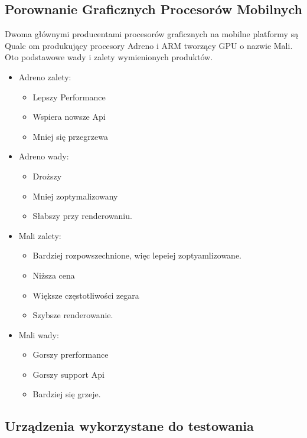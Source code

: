 \subsection[Porownanie Graficznych Procesorów Mobilnych]{Porownanie Graficznych Procesorów Mobilnych}
Dwoma głównymi producentami procesorów graficznych na mobilne platformy są Qualc om produkujący procesory Adreno i ARM tworzący GPU o nazwie Mali. 
Oto podstawowe wady i zalety wymienionych produktów.
\begin{itemize}
	\item Adreno zalety:
	\begin{itemize}
		\item Lepszy Performance
		\item Wspiera nowsze Api
		\item Mniej się przegrzewa
	\end{itemize}
	\item Adreno wady:
	\begin{itemize}
		\item Droższy
		\item Mniej zoptymalizowany
		\item Słabszy przy renderowaniu.
	\end{itemize}
	\item Mali zalety:
	\begin{itemize}
		\item Bardziej rozpowszechnione, więc lepeiej zoptyamlizowane.
		\item Niższa cena
		\item Większe częstotliwości zegara
		\item Szybsze renderowanie.
	\end{itemize}
	\item Mali wady:
	\begin{itemize}
		\item Gorszy prerformance
		\item Gorszy support Api
		\item Bardziej się grzeje.
	\end{itemize}
\end{itemize}
	
	
\subsection[Urządzenia wykorzystane do testowania]{Urządzenia wykorzystane do testowania}
